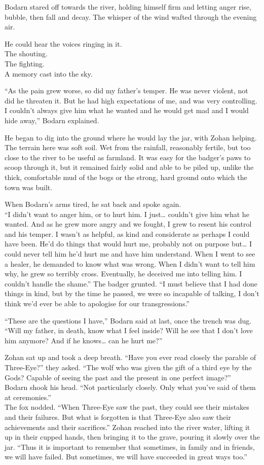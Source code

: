 Bodarn stared off towards the river, holding himself firm and letting anger rise, bubble, then fall and decay. The whisper of the wind wafted through the evening air.

He could hear the voices ringing in it.\\
The shouting.\\
The fighting.\\
A memory cast into the sky.

``As the pain grew worse, so did my father's temper. He was never violent, not did he threaten it. But he had high expectations of me, and was very controlling. I couldn't always give him what he wanted and he would get mad and I would hide away,'' Bodarn explained.

He began to dig into the ground where he would lay the jar, with Zohan helping. The terrain here was soft soil. Wet from the rainfall, reasonably fertile, but too close to the river to be useful as farmland. It was easy for the badger's paws to scoop through it, but it remained fairly solid and able to be piled up, unlike the thick, comfortable mud of the bogs or the strong, hard ground onto which the town was built.

When Bodarn's arms tired, he sat back and spoke again.\\
``I didn't want to anger him, or to hurt him. I just\ldots{} couldn't give him what he wanted. And as he grew more angry and we fought, I grew to resent his control and his temper. I wasn't as helpful, as kind and considerate as perhaps I could have been. He'd do things that would hurt me, probably not on purpose but\ldots{} I could never tell him he'd hurt me and have him understand. When I went to see a healer, he demanded to know what was wrong. When I didn't want to tell him why, he grew so terribly cross. Eventually, he deceived me into telling him. I couldn't handle the shame.'' The badger grunted. ``I must believe that I had done things in kind, but by the time he passed, we were so incapable of talking, I don't think we'd ever be able to apologise for our transgressions.''

``These are the questions I have,'' Bodarn said at last, once the trench was dug. ``Will my father, in death, know what I feel inside? Will he see that I don't love him anymore? And if he knows\ldots{} can he hurt me?''

Zohan sat up and took a deep breath. ``Have you ever read closely the parable of Three-Eye?'' they asked. ``The wolf who was given the gift of a third eye by the Gods? Capable of seeing the past and the present in one perfect image?''\\
Bodarn shook his head. ``Not particularly closely. Only what you've said of them at ceremonies.''\\
The fox nodded. ``When Three-Eye saw the past, they could see their mistakes and their failures. But what is forgotten is that Three-Eye also saw their achievements and their sacrifices.'' Zohan reached into the river water, lifting it up in their cupped hands, then bringing it to the grave, pouring it slowly over the jar. ``Thus it is important to remember that sometimes, in family and in friends, we will have failed. But sometimes, we will have succeeded in great ways too.''

